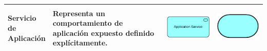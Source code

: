 {\begin{longtable}{|p{0.15\linewidth}|p{0.45\linewidth}|p{0.2\linewidth} p{0.2\linewidth}|}
    	
    	Servicio de Aplicación 
    	&
    	Representa un comportamiento de aplicación expuesto definido explícitamente. 
    	&
    	\begin{center}
    		\includegraphics[width=1\linewidth]{imgs/Aplication_service.pdf}
    	\end{center} &
    	\begin{center}
    		\includegraphics[width=0.7\linewidth]{imgs/service.pdf}
    	\end{center}
    	\\ \hline
    	

\end{longtable}}
